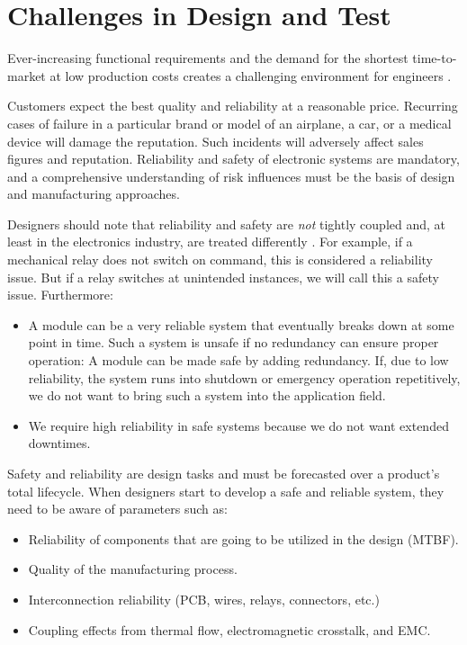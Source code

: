 

\section{Challenges in Design and Test}
\label{sec:design-and-test-challenges}

Ever-increasing functional requirements and the demand for the shortest
time-to-market at low production costs creates a challenging environment
for engineers \autocite{Kopp}.

Customers expect the best quality and reliability at a reasonable price.
Recurring cases of failure in a particular brand or model of an airplane,
a car, or a medical device will damage the reputation.
Such incidents will adversely affect sales figures and reputation.
Reliability and safety of electronic systems are mandatory, and a comprehensive
understanding of risk influences must be the basis of design and manufacturing
approaches.

Designers should note that reliability and safety are \emph{not} tightly coupled
and, at least in the electronics industry, are treated
differently \autocite{Evans}.
For example, if a mechanical relay does not switch on command,
this is considered a reliability issue. But if a relay switches at unintended
instances, we will call this a safety issue.
Furthermore:

\begin{itemize}[topsep=8pt,itemsep=4pt,partopsep=4pt, parsep=4pt]
    \item  A module can be a very reliable system that eventually breaks down
    at some point in time.
    Such a system is unsafe if no redundancy can ensure proper operation:
    A module can be made safe by adding redundancy.
    If, due to low reliability, the system runs into shutdown or emergency
    operation repetitively, we do not want to bring such a system into the
    application field.
    \item We require high reliability in safe systems because we do not want
    extended downtimes.
\end{itemize}

Safety and reliability are design tasks and must be forecasted over a product's
total lifecycle.
When designers start to develop a safe and reliable system, they need to be
aware of parameters such as:

\begin{itemize}[topsep=8pt,itemsep=4pt,partopsep=4pt, parsep=4pt]
    \item Reliability of components that are going to be utilized in
    the design (\ac{MTBF}).
    \item Quality of the manufacturing process.
    \item Interconnection reliability (\ac{PCB}, wires, relays,
    connectors, etc.)
    \item Coupling effects from thermal flow, electromagnetic crosstalk, and
    \ac{EMC}.
\end{itemize}

